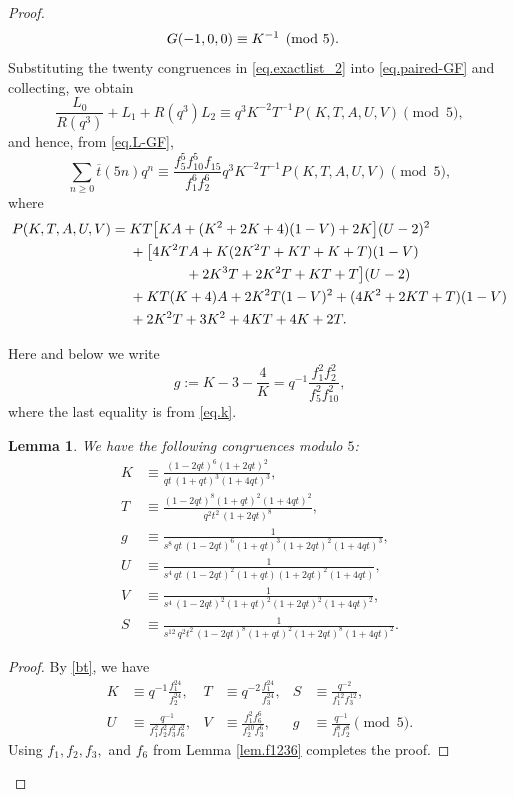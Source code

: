 \documentclass{amsart}
\newtheorem{lemma}[theorem]{Lemma}
\theoremstyle{definition}
\def\mygamma{R(q^3)}
\newcommand{\tbar}{\overline{t}}
\begin{document}
\begin{proof}
\begin{align}
G(-1,0,0)&\equiv K^{-1} \pmod 5.\notag
\end{align}
Substituting the twenty congruences in \eqref{eq.exactlist_2}
into \eqref{eq.paired-GF} and collecting, we obtain
$$\frac{L_0}{\mygamma}+L_1+\mygamma L_2
\equiv q^3K^{-2}T^{-1}P(K,T,A,U,V)\pmod5,$$
and hence, from \eqref{eq.L-GF},
\begin{equation}
\sum_{n\geq0}\tbar(5n)q^n
\equiv\frac{f_5^{5}f_{10}^{5}f_{15}}{f_1^{6}f_2^{6}}q^3K^{-2}T^{-1}P(K,T,A,U,V)\pmod5,
\label{eq.P}
\end{equation}
where
\begin{align}\label{eq.P2}
P(K,T,A,U,V)={}&KT\bigl[KA+(K^{2}+2K+4)(1-V)+2K\bigr](U-2)^{2}\\
\notag&+\bigl[4K^{2}TA+K(2K^{2}T+KT+K+T)(1-V)\\
\notag&\qquad\qquad{}+2K^{3}T+2K^{2}T+KT+T\bigr](U-2)\\
\notag&+KT(K+4)A+2K^{2}T(1-V)^{2}+(4K^{2}+2KT+T)(1-V)\\
\notag&+2K^{2}T+3K^{2}+4KT+4K+2T .
\end{align}

Here and below we write
\begin{equation}\label{eq.g-def}
    g:=K-3-\frac4K =q^{-1}\dfrac{f_1^{2}f_2^{2}}{f_5^{2}f_{10}^{2}},
\end{equation}
where the last equality is from \eqref{eq.k}. 

\begin{lemma}\label{lem.param}
We have the following congruences modulo $5$:
\begin{align}
\label{eq.pK} K&\equiv\frac{(1-2qt)^{6}(1+2qt)^{2}}{qt\,(1+qt)^{3}(1+4qt)^{3}},\\
\label{eq.pT} T&\equiv\frac{(1-2qt)^{8}(1+qt)^{2}(1+4qt)^{2}}{q^{2}t^{2}\,(1+2qt)^{8}},\\
\label{eq.pg} g&\equiv\frac{1}{s^{8}\,qt\,(1-2qt)^{6}(1+qt)^{3}(1+2qt)^{2}(1+4qt)^{3}},\\
\label{eq.pU} U&\equiv\frac{1}{s^{4}\,qt\,(1-2qt)^{2}(1+qt)(1+2qt)^{2}(1+4qt)},\\
\label{eq.pV} V&\equiv\frac{1}{s^{4}\,(1-2qt)^{2}(1+qt)^{2}(1+2qt)^{2}(1+4qt)^{2}},\\
\label{eq.pS} S&\equiv\frac{1}{s^{12}\,q^{2}t^{2}\,(1-2qt)^{8}(1+qt)^{2}(1+2qt)^{8}(1+4qt)^{2}}.
\end{align}
\end{lemma}

\begin{proof}
By \eqref{bt}, we have
\begin{align}
\label{eq.e1} K&\equiv q^{-1}\frac{f_1^{24}}{f_2^{24}}, &
T&\equiv q^{-2}\frac{f_1^{24}}{f_3^{24}}, &
S&\equiv \frac{q^{-2}}{f_1^{12}f_3^{12}},\\
\label{eq.e2} U&\equiv \frac{q^{-1}}{f_1^{2}f_2^{2}f_3^{2}f_6^{2}}, &
V&\equiv \frac{f_1^{2}f_6^{6}}{f_2^{10}f_3^{6}}, &
g&\equiv \frac{q^{-1}}{f_1^{8}f_2^{8}}\pmod 5 .
\end{align}
Using $f_1, f_2, f_3,$ and $f_6$ from Lemma \ref{lem.f1236} completes the proof. 
\end{proof}


\end{proof}
\end{document}
